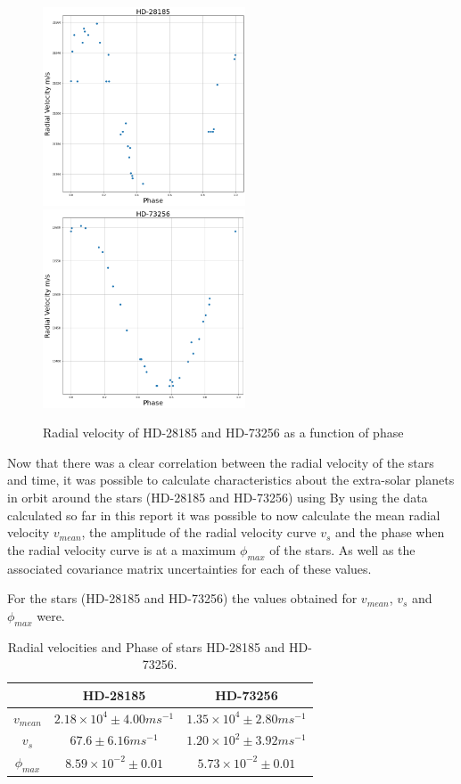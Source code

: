 \documentclass[]{article}
\begin{document}
\begin{figure}[h]
\includegraphics[width=6cm]{images/HD-28185_phase.png}
\includegraphics[width=6cm]{images/HD-73256_phase.png}
\caption{Radial velocity of HD-28185 and HD-73256 as a function of phase}
\label{fig:HD-_phase}
\end{figure}

Now that there was a clear correlation between the radial velocity of the stars and
time, it was possible to calculate characteristics about the extra-solar planets in 
orbit around the stars (HD-28185 and HD-73256) using %
By using the data calculated so far in this report it was possible to now calculate 
the mean radial velocity $v_{mean} $, the amplitude of the radial velocity curve
 $v_{s}$ and the 
phase when the radial velocity curve is at a maximum $\phi_{max}$ of the stars.
As well as the associated covariance matrix uncertainties for each of these values.
\par
For the stars (HD-28185 and HD-73256) the values obtained for $v_{mean}$, $v_{s}$ 
and $\phi_{max}$ were.


\begin{table}[h!]
    \begin{center}
      \caption{Radial velocities and Phase of stars HD-28185 and HD-73256.}
      \label{tab:table1}
      \begin{tabular}{c|c|c}
         & {HD-28185} & {HD-73256} \\
        \hline
        $v_{mean} $ & $ 2.18\times10^4 \pm4.00ms^{-1}$ & $1.35\times10^4\pm2.80ms^{-1}$ \\
        \hline
        $v_{s}$ & $67.6\pm6.16ms^{-1} $ & $1.20\times10^2\pm3.92ms^{-1}$\\
        \hline
        $\phi_{max}$ & $8.59\times10^{-2} \pm 0.01$ & $5.73\times10^{-2}\pm0.01$  \\
        
      \end{tabular}
    \end{center}
  \end{table}
\end{document}
